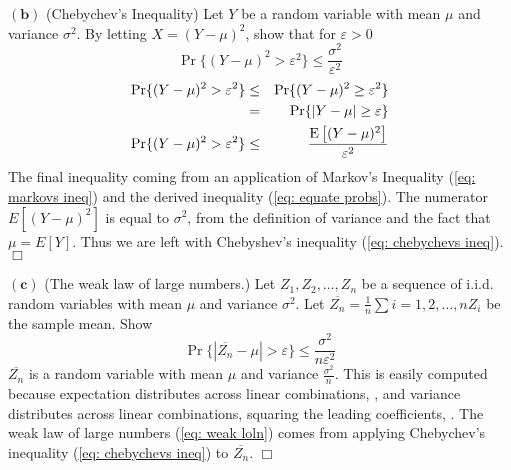 \documentclass[10pt]{article}
\DeclareMathOperator*{\E}{\mbox{\text{E}}}
\newcommand{\pref}[1]{{(\ref{#1})}}
\begin{document}
\begin{tiny}
\begin{multicols}{3}
$\mathbf{(b)}$
(Chebychev's Inequality) Let $Y$ be a random variable with mean $\mu$ and
variance $\sigma^2$. By letting $X = (Y-\mu)^2$, show that for
$\varepsilon > 0$
\begin{equation}
    \Pr \{(Y-\mu)^2 > \varepsilon^2\} \leq \frac{\sigma^2}{\varepsilon^2}
    \label{eq: chebychevs ineq}
\end{equation}
\proof
\begin{eqnarray}
    \Pr\{(Y-\mu)^2 > \varepsilon^2\} &\leq& \Pr\{(Y-\mu)^2 \geq \varepsilon^2\}
        \nonumber \\
        &=& \Pr\{|Y-\mu| \geq \varepsilon\}
        \label{eq: equate probs} \\
    \Pr \{(Y-\mu)^2 > \varepsilon^2\} &\leq& \frac{\E \big[(Y-\mu)^2\big]}{\varepsilon^2}
        \label{eq:instatiate 3.1a}
\end{eqnarray}
The final inequality coming from an application of Markov's Inequality
\pref{eq: markovs ineq} and the derived inequality \pref{eq: equate probs}.
The numerator $E[(Y-\mu)^2]$ is equal to $\sigma^2$, from the definition
of variance and the fact that $\mu = E[Y]$. Thus we are left with
Chebyshev's inequality \pref{eq: chebychevs ineq}. $\Box$

$\mathbf{(c)}$
(The weak law of large numbers.) Let $Z_1,Z_2,\dots,Z_n$ be a sequence of
i.i.d. random variables with mean $\mu$ and variance $\sigma^2$. Let
$\overline{Z_n} = \frac{1}{n}\sum{i=1,2,\dots,n}Z_i$ be the sample mean.
Show 
\begin{equation}
    \Pr \{|\overline{Z_n} - \mu| > \varepsilon\} \leq
    \frac{\sigma^2}{n\varepsilon^2}
    \label{eq: weak loln}
\end{equation}
\proof
$\overline{Z_n}$ is a random variable with mean $\mu$ and variance
$\frac{\sigma^2}{n}$. This is easily computed because expectation
distributes across linear combinations, 
, and variance distributes across linear combinations, squaring the
leading coefficients,
. The weak law of large numbers \pref{eq: weak loln} comes from applying
Chebychev's inequality \pref{eq: chebychevs ineq} to $\overline{Z_n}$.
$\Box$


\end{multicols}
\end{tiny}
\end{document}
